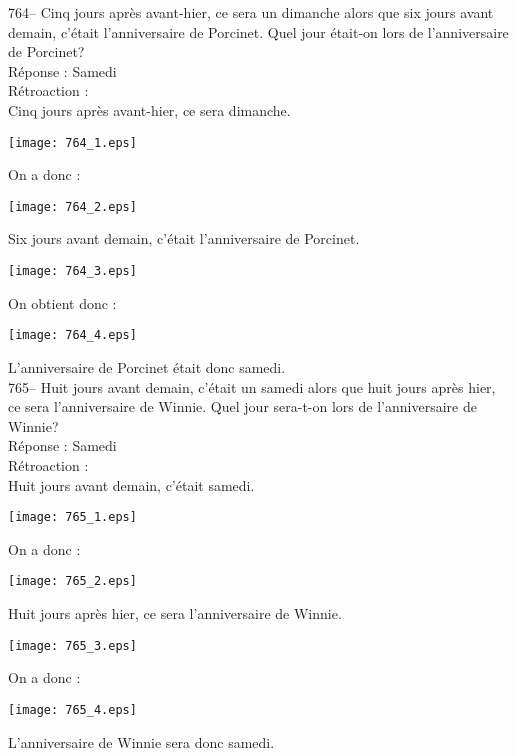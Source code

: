 ﻿\documentclass[letterpaper, 12pt]{article}
\begin{document}
764-- Cinq jours apr\`es avant-hier, ce sera un dimanche alors que six jours
avant demain, c'\'etait l'anniversaire de Porcinet.  Quel jour \'etait-on
lors de l'anniversaire de Porcinet?\\

R\'eponse : Samedi\\

R\'etroaction : \\
Cinq jours apr\`es avant-hier, ce sera dimanche.\\
\begin{center}
\texttt{[image: 764\_1.eps]}
\end{center}
On a donc :\\
\begin{center}
\texttt{[image: 764\_2.eps]}
\end{center}
Six jours avant demain, c'\'etait l'anniversaire de Porcinet.\\
\begin{center}
\texttt{[image: 764\_3.eps]}
\end{center}
On obtient donc :
\begin{center}
\texttt{[image: 764\_4.eps]}
\end{center}
L'anniversaire de Porcinet \'etait donc samedi.\\

765-- Huit jours avant demain, c'\'etait un samedi alors que huit jours
apr\`es hier, ce sera l'anniversaire de Winnie.  Quel jour sera-t-on lors de
l'anniversaire de Winnie?\\

R\'eponse : Samedi\\

R\'etroaction : \\
Huit jours avant demain, c'\'etait samedi.\\
\begin{center}
\texttt{[image: 765\_1.eps]}
\end{center}
On a donc :\\\begin{center}
\texttt{[image: 765\_2.eps]}
\end{center}
Huit jours apr\`es hier, ce sera l'anniversaire de Winnie.\\
\begin{center}
\texttt{[image: 765\_3.eps]}
\end{center}
On a donc :\\
\begin{center}
\texttt{[image: 765\_4.eps]}
\end{center}
L'anniversaire de Winnie sera donc samedi.\\
\end{document}
